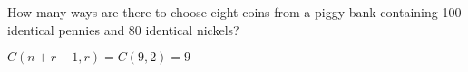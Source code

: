\documentclass[../main.tex]{subfiles}
\begin{document}
How many ways are there to choose eight coins from a piggy bank containing 100 identical pennies and 80 identical nickels?

\solution

$C(n+r-1, r) = C(9, 2) = 9$
\end{document}
